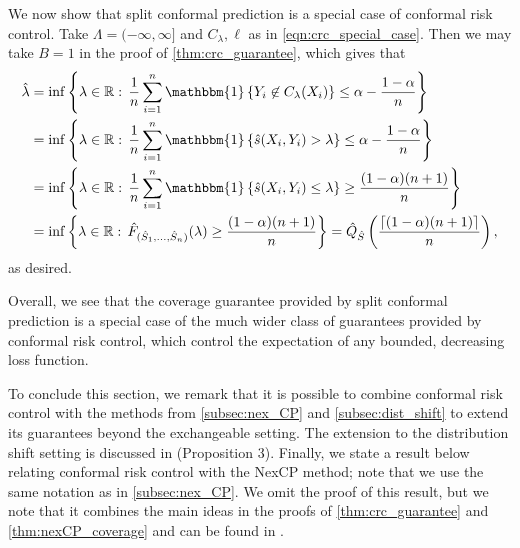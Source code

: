 \documentclass[11pt, titlepage]{article} %
\newcommand{\Ind}[1]{\mathbbm{1}\left\{ #1 \right\}}
\numberwithin{equation}{section}
\theoremstyle{definition}
\numberwithin{theorem}{section}
\numberwithin{lemma}{section}
\numberwithin{corollary}{section}
\numberwithin{proposition}{section}
\numberwithin{definition}{section}
\numberwithin{remark}{section}
\begin{document}
\noindent
We now show that split conformal prediction is a special case of conformal risk control. Take \(\Lambda = (-\infty, \infty]\) and \(C_\lambda, \ell\) as in \eqref{eqn:crc_special_case}. Then we may take \(B = 1\) in the proof of \cref{thm:crc_guarantee}, which gives that \begin{align*}
    \hat{\lambda} &= \inf \left\{ \lambda \in \mathbb{R}: \, \frac{1}{n} \sum_{i=1}^{n} \Ind{Y_i \not \in C_\lambda (X_i)} \leq \alpha - \frac{1-\alpha}{n} \right\} \\
    &= \inf \left\{ \lambda \in \mathbb{R}: \, \frac{1}{n} \sum_{i=1}^{n} \Ind{\hat{s}(X_i, Y_i) > \lambda} \leq \alpha - \frac{1-\alpha}{n} \right\} \\
    &= \inf \left\{ \lambda \in \mathbb{R}: \, \frac{1}{n} \sum_{i=1}^{n} \Ind{\hat{s}(X_i, Y_i) \leq \lambda} \geq \frac{(1-\alpha)(n+1)}{n} \right\} \\
    &= \inf \left\{ \lambda \in \mathbb{R}: \, \hat{F}_{(\hat{S}_1, \ldots, \hat{S}_n)}(\lambda) \geq \frac{(1-\alpha)(n+1)}{n} \right\} = \hat{Q}_{\hat{S}}\left( \frac{\lceil (1-\alpha)(n+1) \rceil}{n} \right),
\end{align*} as desired. \vskip5pt

\noindent
Overall, we see that the coverage guarantee provided by split conformal prediction is a special case of the much wider class of guarantees provided by conformal risk control, which control the expectation of any bounded, decreasing loss function. \vskip5pt

\noindent
To conclude this section, we remark that it is possible to combine conformal risk control with the methods from \cref{subsec:nex_CP} and \cref{subsec:dist_shift} to extend its guarantees beyond the exchangeable setting. The extension to the distribution shift setting is discussed in \cite{angelopoulos2024riskcontrol} (Proposition 3). Finally, we state a result below relating conformal risk control with the NexCP method; note that we use the same notation as in \cref{subsec:nex_CP}. We omit the proof of this result, but we note that it combines the main ideas in the proofs of \cref{thm:crc_guarantee} and \cref{thm:nexCP_coverage} and can be found in \cite{farinhas2024nonexchangeable}.
\end{document}
